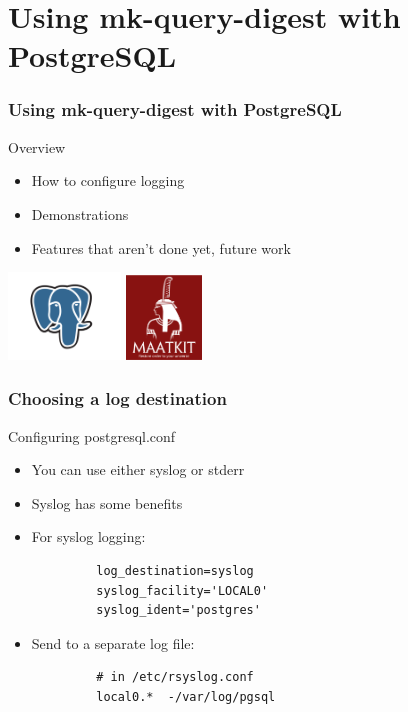 \section{Using mk-query-digest with PostgreSQL}

\begin{frame}
   \frametitle{Using mk-query-digest with PostgreSQL}
   \begin{block}{Overview}
      \begin{itemize}
         \item How to configure logging
         \item Demonstrations
         \item Features that aren't done yet, future work
      \end{itemize}
   \end{block}
   \begin{center}
   \includegraphics[width=30mm]{../image/elephant}
   \includegraphics[width=20mm]{../maatkit-logo}
   \end{center}
\end{frame}

\begin{frame}[fragile]
   \frametitle{Choosing a log destination}
   \begin{block}{Configuring postgresql.conf}
   \begin{itemize}
      \item You can use either syslog or stderr
      \item Syslog has some benefits
      \item For syslog logging:
         \begin{verbatim}
         log_destination=syslog
         syslog_facility='LOCAL0'
         syslog_ident='postgres'
         \end{verbatim}
      \item Send to a separate log file:
         \begin{verbatim}
         # in /etc/rsyslog.conf
         local0.*  -/var/log/pgsql
         \end{verbatim}
   \end{itemize}
   \end{block}
\end{frame}

